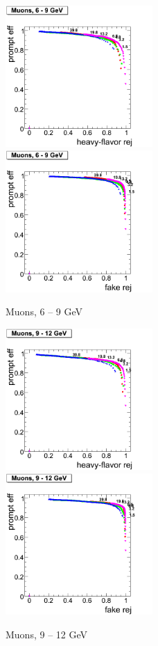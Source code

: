 \clearpage

\begin{figure}[htbp]
   \includegraphics[width = 0.5\textwidth]{pictures/bkgdRej_sigEff/muon_nonPrompt_ptCut1_ptCut2.png}
   \includegraphics[width = 0.5\textwidth]{pictures/bkgdRej_sigEff/muon_fake_ptCut1_ptCut2.png}
   \caption{Muons, 6 -- 9 GeV}
   \label{fig:muon_ptCut1_ptCut2}
\end{figure}

\begin{figure}[htbp]
   \includegraphics[width = 0.5\textwidth]{pictures/bkgdRej_sigEff/muon_nonPrompt_ptCut2_ptCut3.png}
   \includegraphics[width = 0.5\textwidth]{pictures/bkgdRej_sigEff/muon_fake_ptCut2_ptCut3.png}
   \caption{Muons, 9 -- 12 GeV}
   \label{fig:muon_ptCut2_ptCut3}
\end{figure}

